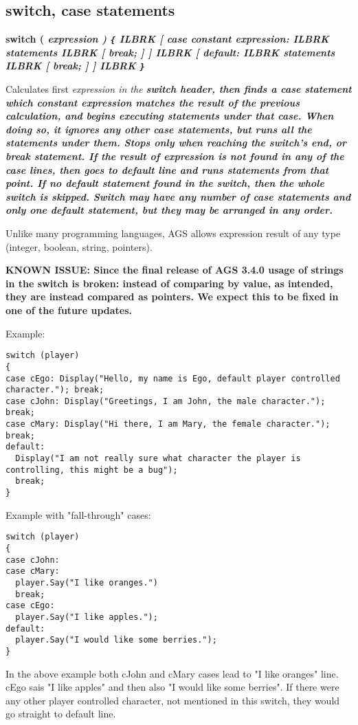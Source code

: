 \subsection{switch, case statements}\label{switchstatement}%

\bf{switch (} \it{expression} \bf{)}  \verb${$ ILBRK
  [
  \bf{case} \it{constant expression}: ILBRK
    \it{statements} ILBRK
    [ \bf{break}; ]
  ] ILBRK
  [
  \bf{default:} ILBRK
    \it{statements} ILBRK
    [ \bf{break}; ]
  ]  ILBRK
\verb$}$

Calculates first \it{expression} in the \bf{switch} header, then finds a \bf{case} statement
which \it{constant expression} matches the \it{result} of the previous calculation, and begins
executing statements under that \bf{case}. When doing so, it ignores any other \bf{case} statements,
but runs all the statements under them. Stops only when reaching the switch's end, or \bf{break}
statement.
If the result of \it{expression} is not found in any of the \bf{case} lines, then goes to \bf{default}
line and runs statements from that point. If no \bf{default} statement found in the switch, then
the whole switch is skipped.
\bf{Switch} may have any number of \bf{case} statements and only one \bf{default} statement, but
they may be arranged in any order.

Unlike many programming languages, AGS allows expression result of any type (integer, boolean,
string, pointers).

\bf{KNOWN ISSUE:} Since the final release of AGS 3.4.0 usage of strings in the switch is broken:
instead of comparing by value, as intended, they are instead compared as pointers. We expect this
to be fixed in one of the future updates.

Example:

\begin{verbatim}
switch (player)
{
case cEgo: Display("Hello, my name is Ego, default player controlled character."); break;
case cJohn: Display("Greetings, I am John, the male character."); break;
case cMary: Display("Hi there, I am Mary, the female character."); break;
default:
  Display("I am not really sure what character the player is controlling, this might be a bug");
  break;
}
\end{verbatim}

Example with "fall-through" cases:

\begin{verbatim}
switch (player)
{
case cJohn:
case cMary:
  player.Say("I like oranges.")
  break;
case cEgo:
  player.Say("I like apples.");
default:
  player.Say("I would like some berries.");
}
\end{verbatim}
In the above example both cJohn and cMary cases lead to "I like oranges" line.
cEgo sais "I like apples" and then also "I would like some berries". If there were any other player
controlled character, not mentioned in this switch, they would go straight to default line.


